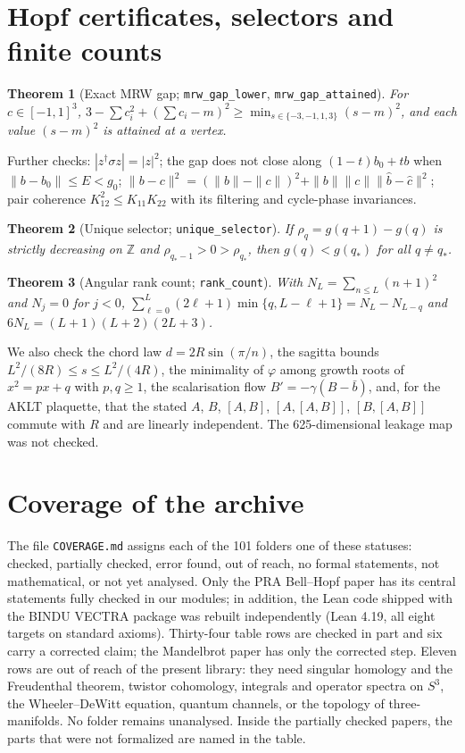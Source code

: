 \documentclass[11pt]{article}
\newtheorem{theorem}{Theorem}[section]
\theoremstyle{remark}
\newcommand{\lean}[1]{\texttt{#1}}
\begin{document}
\section{Hopf certificates, selectors and finite counts}
\begin{theorem}[Exact MRW gap; \lean{mrw\_gap\_lower}, \lean{mrw\_gap\_attained}]
For $c\in[-1,1]^3$, $3-\sum c_i^2+(\sum c_i-m)^2\ge\min_{s\in\{-3,-1,1,3\}}(s-m)^2$, and each
value $(s-m)^2$ is attained at a vertex.
\end{theorem}
Further checks: $|z^\dagger\sigma z|=|z|^2$; the gap does not close along $(1-t)b_0+tb$
when $\|b-b_0\|\le E<g_0$; $\|b-c\|^2=(\|b\|-\|c\|)^2+\|b\|\|c\|\|\hat b-\hat c\|^2$;
pair coherence $K_{12}^2\le K_{11}K_{22}$ with its filtering and cycle-phase invariances.
\begin{theorem}[Unique selector; \lean{unique\_selector}]
If $\rho_q=g(q+1)-g(q)$ is strictly decreasing on $\mathbb Z$ and
$\rho_{q_*-1}>0>\rho_{q_*}$, then $g(q)<g(q_*)$ for all $q\ne q_*$.
\end{theorem}
\begin{theorem}[Angular rank count; \lean{rank\_count}]
With $N_L=\sum_{n\le L}(n+1)^2$ and $N_j=0$ for $j<0$,
$\sum_{\ell=0}^L(2\ell+1)\min\{q,L-\ell+1\}=N_L-N_{L-q}$ and $6N_L=(L+1)(L+2)(2L+3)$.
\end{theorem}
We also check the chord law $d=2R\sin(\pi/n)$, the sagitta bounds
$L^2/(8R)\le s\le L^2/(4R)$, the minimality of $\varphi$ among growth roots of
$x^2=px+q$ with $p,q\ge1$, the scalarisation flow $B'=-\gamma(B-\bar b)$, and, for the AKLT
plaquette, that the stated $A$, $B$, $[A,B]$, $[A,[A,B]]$, $[B,[A,B]]$ commute with $R$ and
are linearly independent. The 625-dimensional leakage map was not checked.

\section{Coverage of the archive}
The file \lean{COVERAGE.md} assigns each of the 101 folders one of these statuses:
checked, partially checked, error found, out of reach, no formal statements, not
mathematical, or not yet analysed. Only the PRA Bell--Hopf paper has its central statements
fully checked in our modules; in addition, the Lean code shipped with the BINDU VECTRA
package was rebuilt independently (Lean 4.19, all eight targets on standard axioms). Thirty-four table rows are checked in part and six carry a corrected claim; the
Mandelbrot paper has only the corrected step. Eleven rows are out of reach of the present
library: they need singular homology and the Freudenthal theorem, twistor cohomology,
integrals and operator spectra on $S^3$, the Wheeler--DeWitt equation, quantum channels, or
the topology of three-manifolds. No folder remains unanalysed. Inside the partially checked
papers, the parts that were not formalized are named in the table.
\end{document}

